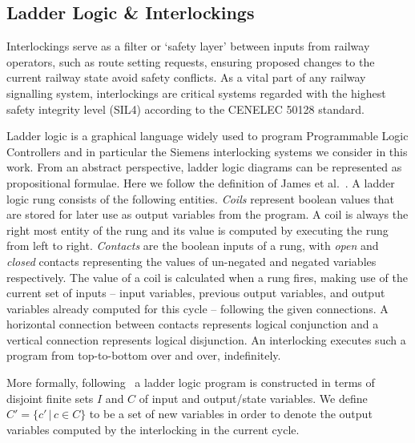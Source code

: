 \documentclass[runningheads]{llncs}
\begin{document}
\subsection{Ladder Logic \& Interlockings}\label{sec:ladder_logic}
Interlockings serve as a filter or ‘safety layer’ between inputs from railway operators, such as route setting requests, ensuring proposed changes to the current railway state avoid safety conflicts. As a vital part of any railway signalling system, interlockings are critical systems regarded with the highest safety integrity level
(SIL4) according to the CENELEC 50128 standard. 

Ladder logic is a graphical language widely used to program Programmable Logic Controllers\cite{tiegelkamp2010iec} and in particular the Siemens interlocking systems we consider in this work. From an abstract perspective, ladder logic diagrams can be represented as
propositional formulae. Here we follow the definition of James et al.~\cite{james2013verification}. A ladder logic rung consists of the following entities.
\emph{Coils}
represent boolean values that are stored for later use as output
variables from the program. A coil is always the right most entity
of the rung and its value is computed by executing the rung from left
to right.
\emph{Contacts} are the boolean inputs of a rung,
with \emph{open} and \emph{closed} contacts representing the values
of un-negated and negated variables respectively.  The value of a coil
is calculated when a rung fires, making use of the current set of
inputs -- input variables, previous output variables,
and output variables already computed for this cycle --
following the given connections.  A horizontal connection between
contacts represents logical conjunction and a vertical connection
represents logical disjunction. An interlocking executes such a program from top-to-bottom over and over, indefinitely.

More formally, following~\cite{james2013verification} a ladder logic program is constructed in terms of disjoint finite sets
$I$ and $C$ of input and output/state variables. We define $C' = \{ c' \, | \, c \in C \}$ to be a set of new variables
in order to denote the output variables computed by the interlocking in the current
cycle.
\end{document}

